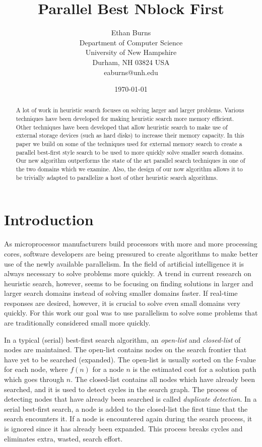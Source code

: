 \documentclass{article}
\title{Parallel Best Nblock First}
\author{Ethan Burns \\
  Department of Computer Science \\
  University of New Hampshire \\
  Durham, NH 03824 USA \\
  eaburns@unh.edu}
\date{\today}
\begin{document}
\maketitle

\begin{abstract}
  A lot of work in heuristic search focuses on solving larger and
  larger problems.  Various techniques have been developed for making
  heuristic search more memory efficient.  Other techniques have been
  developed that allow heuristic search to make use of external
  storage devices (such as hard disks) to increase their memory
  capacity.  In this paper we build on some of the techniques used for
  external memory search to create a parallel best-first style search
  to be used to more quickly solve smaller search domains.  Our new
  algorithm outperforms the state of the art parallel search
  techniques in one of the two domains which we examine.  Also, the
  design of our now algorithm allows it to be trivially adapted to
  parallelize a host of other heuristic search algorithms.
\end{abstract}

\section{Introduction}

As microprocessor manufacturers build processors with more and more
processing cores, software developers are being pressured to create
algorithms to make better use of the newly available parallelism.  In
the field of artificial intelligence it is always necessary to solve
problems more quickly.  A trend in current research on heuristic
search, however, seems to be focusing on finding solutions in larger
and larger search domains instead of solving smaller domains faster.
If real-time responses are desired, however, it is crucial to solve
even small domains very quickly.  For this work our goal was to use
parallelism to solve some problems that are traditionally considered
small more quickly.

In a typical (serial) best-first search algorithm, an \emph{open-list}
and \emph{closed-list} of nodes are maintained.  The open-list
contains nodes on the search frontier that have yet to be searched
(expanded).  The open-list is usually sorted on the f-value for each
node, where $f(n)$ for a node $n$ is the estimated cost for a solution
path which goes through $n$.  The closed-list contains all nodes which
have already been searched, and it is used to detect cycles in the
search graph.  The process of detecting nodes that have already been
searched is called \emph{duplicate detection}.  In a serial best-first
search, a node is added to the closed-list the first time that the
search encounters it.  If a node is encountered again during the
search process, it is ignored since it has already been expanded.
This process breaks cycles and eliminates extra, wasted, search
effort.
\end{document}
